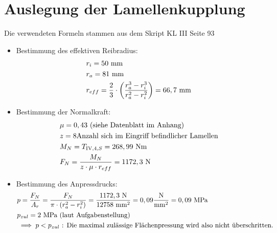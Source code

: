 \section{Auslegung der Lamellenkupplung}
Die verwendeten Formeln stammen aus dem Skript KL III  Seite 93
\begin{itemize}
\item Bestimmung des effektiven Reibradius:
\begin{align*}
	&r_i = 50  \text{ mm} \\
	&r_a = 81  \text{ mm} \\
	&r_{eff} = \frac{2}{3} \cdot \left( \frac{r_a^3- r_i^3}{r_a^2 - r_i ^2} \right) = 66,7 \text{ mm} 
\end{align*}
\item Bestimmung der Normalkraft:
\begin{align*}
	&\mu = 0,43 \text{ (siehe Datenblatt im Anhang)} \\
	&z= 8 \text{Anzahl sich im Eingriff befindlicher Lamellen} \\
	&M_N = T_{\mathord{\mathrm{IV}},4,S} = 268,99 \text{ Nm} \\
	& F_N = \frac{M_N}{z \cdot \mu \cdot r_{eff}} = 1172,3 \text{ N}
\end{align*}
\item Bestimmung des Anpressdrucks:
\begin{align*}
	&p = \frac{F_N}{A_r} = \frac{F_N}{\pi \cdot (r_a^2 - r_i^2)} = \frac{1172,3 \text{ N}}{12758 \text{ mm}^2} = 0,09 \frac{\text{N}}{\text{mm}^2} = 0,09 \text{ MPa}\\
	&p_{zul} = 2 \text{ MPa (laut Aufgabenstellung)} \\
	& \implies p < p_{zul} \text{ : Die maximal zulässige Flächenpressung wird also nicht überschritten.}
\end{align*}
\end{itemize}